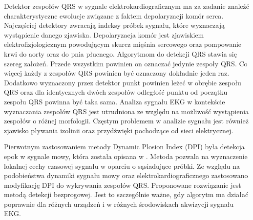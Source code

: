 \documentclass[10pt,a4paper]{article}
\begin{document}
Detektor zespołów QRS w sygnale elektrokardiograficznym ma za zadanie znaleźć charakterystyczne ewolucje związane z faktem depolaryzacji komór serca. Najczęściej detektory zwracają indeksy próbek sygnału, które wyznaczają wystąpienie danego zjawiska. Depolaryzacja komór jest zjawiskiem elektrofizjologicznym powodującym skurcz mięśnia sercowego oraz pompowanie krwi do aorty oraz do pnia płucnego. Algorytmom do detekcji QRS stawia się szereg założeń. Przede wszystkim powinien on oznaczać jedynie zespoły QRS. Co więcej każdy z zespołów QRS powinien być oznaczony dokładnie jeden raz. Dodatkowo wyznaczony przez detektor punkt powinien leżeć w obrębie zespołu QRS oraz dla identycznych dwóch zespołów odległość punktu od początku zespołu QRS powinna być taka sama. Analiza sygnału EKG w kontekście wyznaczania zespołów QRS jest utrudniona ze względu na możliwość wystąpienia zespołów o różnej morfologii. Częstym problemem w analizie sygnału jest również zjawisko pływania izolinii oraz przydźwięki pochodzące od sieci elektrycznej.  


Pierwotnym zastosowaniem metody Dynamic Plosion Index (DPI) była detekcja epok w sygnale mowy, która została opisana w \cite{dpi}. Metoda pozwala na wyznaczenie lokalnej cechy czasowej sygnału w oparciu o sąsiadujące próbki. Ze względu na podobieństwa dynamiki sygnału mowy oraz elektrokardiograficznego zastosowano  modyfikację DPI do wykrywania zespołów QRS. Proponowane rozwiązanie jest metodą detekcji bezprogowej. Jest to szczególnie ważne, gdy algorytm ma działać poprawnie dla różnych urządzeń i w różnych środowiskach akwizycji sygnału EKG. 
\end{document}
